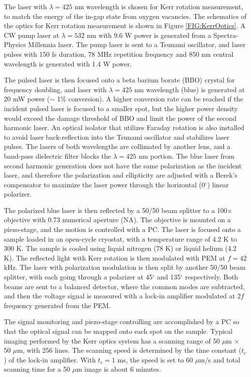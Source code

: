 \documentclass[pdflatex, sectionletters, 12pt]{pittetd}    %
\begin{document}
The laser with $\lambda = 425$ nm wavelength is chosen for Kerr rotation measurement, to match the energy of the in-gap state from oxygen vacancies\cite{rice2014persistent}. The schematics of the optics for Kerr rotation measurement is shown in Figure \ref{FIG:KerrOptics}. A CW pump laser at $\lambda=532$ nm with 9.6 W power is generated from a Spectra-Physics Millennia laser. The pump laser is sent to a Tsunami oscillator, and laser pulses with 150 fs duration, 78 MHz repetition frequency and 850 nm central wavelength is generated with 1.4 W power. 

The pulsed laser is then focused onto a beta barium borate (BBO) crystal for frequency doubling, and laser with $\lambda=425$ nm wavelength (blue) is generated at 20 mW power ($\sim$ 1\% conversion). A higher conversion rate can be reached if the incident pulsed laser is focused to a smaller spot, but the higher power density would exceed the damage threshold of BBO and limit the power of the second harmonic laser. An optical isolator that utilizes Faraday rotation is also installed to avoid laser back-reflection into the Tsunami oscillator and stabilizes laser pulses. The lasers of both wavelengths are collimated by another lens, and a band-pass dielectric filter blocks the $\lambda=425$ nm portion. The blue laser from second harmonic generation does not have the same polarization as the incident laser, and therefore the polarization and ellipticity are adjusted with a Berek's compensator to maximize the laser power through the horizontal (0$^{\circ}$) linear polarizer. 

The polarized blue laser is then reflected by a 50/50 beam splitter to a 100$\times$ objective with 0.73 numerical aperture (NA). The objective is mounted on a piezo-stage, and the motion is controlled with a PC. The laser is focused onto a sample loaded in an open-cycle cryostat, with a temperature range of 4.2 K to 300 K. The sample is cooled using liquid nitrogen (78 K) or liquid helium (4.2 K). The reflected light with Kerr rotation is then modulated with PEM at $f = 42$ kHz. The laser with polarization modulation is then split by another 50/50 beam splitter, with each going through a polarizer at 45$^{\circ}$ and 135$^{\circ}$ respectively. Both beams are sent to a balanced detector, where the common modes are subtracted, and then the voltage signal is measured with a lock-in amplifier modulated at $2f$ frequency generated from the PEM. 

The signal monitoring and piezo-stage controlling are accomplished by a PC so that the optical signal can be mapped onto each spot on the sample. Typical imaging performed by the Kerr optics system has a scanning range of 50 $\mu$m $\times$ 50 $\mu$m, with 256 lines. The scanning speed is determined by the time constant ($t_c$) of the lock-in amplifier. With $t_c = 1$ ms, the speed is set to 60 $\mu$m/s and total scanning time for a 50 $\mu$m image is about 6 minutes.
\end{document}

